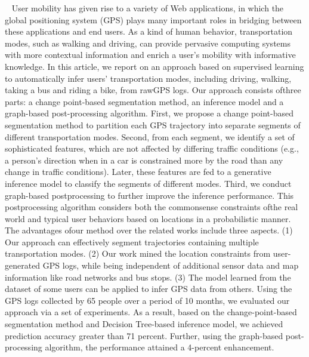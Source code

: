 ~\cite{zheng2010understanding}
User mobility has given rise to a variety of Web applications, in which the global positioning system (GPS) plays many important roles in bridging between these applications and end users. As a kind of human behavior, transportation modes, such as walking and driving, can provide pervasive computing systems with more contextual information and enrich a user’s mobility with informative knowledge. In this article, we report on an approach based on supervised learning to automatically infer users’ transportation modes, including driving, walking, taking a bus and riding a bike, from rawGPS logs. Our approach consists ofthree parts: a change point-based segmentation method, an inference model and a graph-based post-processing algorithm. First, we propose a change point-based segmentation method to partition each GPS trajectory into separate segments of different transportation modes. Second, from each segment, we identify a set of sophisticated features, which are not affected by differing traffic conditions (e.g., a person’s direction when in a car is constrained more by the road than any change in traffic conditions). Later, these features are fed to a generative inference model to classify the segments of different modes. Third, we conduct graph-based postprocessing to further improve the inference performance. This postprocessing algorithm considers both the commonsense constraints ofthe real world and typical user behaviors based on locations in a probabilistic manner. The advantages ofour method over the related works include three aspects. (1) Our approach can effectively segment trajectories containing multiple transportation modes. (2) Our work mined the location constraints from user-generated GPS logs, while being independent of additional sensor data and map information like road networks and bus stops. (3) The model learned from the dataset of some users can be applied to infer GPS data from others. Using the GPS logs collected by 65 people over a period of 10 months, we evaluated our approach via a set of experiments. As a result, based on the change-point-based segmentation method and Decision Tree-based inference model, we achieved prediction accuracy greater than 71 percent. Further, using the graph-based post-processing algorithm, the performance attained a 4-percent enhancement.

